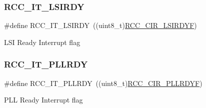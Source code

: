 \subsubsection{\texorpdfstring{R\+C\+C\+\_\+\+I\+T\+\_\+\+L\+S\+I\+R\+DY}{RCC\_IT\_LSIRDY}}
{\footnotesize\ttfamily \#define R\+C\+C\+\_\+\+I\+T\+\_\+\+L\+S\+I\+R\+DY~((uint8\+\_\+t)\hyperlink{group___peripheral___registers___bits___definition_gacb94ccfe6a212f020e732d1dd787a6fb}{R\+C\+C\+\_\+\+C\+I\+R\+\_\+\+L\+S\+I\+R\+D\+YF})}

L\+SI Ready Interrupt flag \mbox{\label{group___r_c_c___interrupt_ga68d48e7811fb58f2649dce6cf0d823d9}} 
\subsubsection{\texorpdfstring{R\+C\+C\+\_\+\+I\+T\+\_\+\+P\+L\+L\+R\+DY}{RCC\_IT\_PLLRDY}}
{\footnotesize\ttfamily \#define R\+C\+C\+\_\+\+I\+T\+\_\+\+P\+L\+L\+R\+DY~((uint8\+\_\+t)\hyperlink{group___peripheral___registers___bits___definition_ga0f007895a17e668f22f7b8b24ca90aec}{R\+C\+C\+\_\+\+C\+I\+R\+\_\+\+P\+L\+L\+R\+D\+YF})}

P\+LL Ready Interrupt flag 